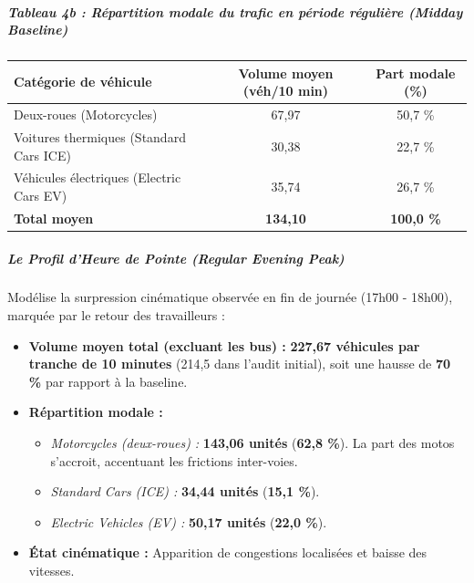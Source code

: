 \documentclass[10pt, a4paper]{article}
\newcounter{none}
\providecommand{\tightlist}{}
\begin{document}
\subparagraph{Tableau 4b : Répartition modale du trafic en période
régulière (Midday
Baseline)}\label{tableau-4b-ruxe9partition-modale-du-trafic-en-puxe9riode-ruxe9guliuxe8re-midday-baseline}

{\def\LTcaptype{none} %
\begin{longtable}[]{@{}lcc@{}}
\toprule\noalign{}
Catégorie de véhicule & Volume moyen (véh/10 min) & Part modale (\%) \\
\midrule\noalign{}
\endhead
\bottomrule\noalign{}
\endlastfoot
Deux-roues (Motorcycles) & 67,97 & 50,7 \% \\
Voitures thermiques (Standard Cars ICE) & 30,38 & 22,7 \% \\
Véhicules électriques (Electric Cars EV) & 35,74 & 26,7 \% \\
\textbf{Total moyen} & \textbf{134,10} & \textbf{100,0 \%} \\
\end{longtable}
}

\subparagraph{Le Profil d'Heure de Pointe (Regular Evening
Peak)}\label{le-profil-dheure-de-pointe-regular-evening-peak}

Modélise la surpression cinématique observée en fin de journée (17h00 -
18h00), marquée par le retour des travailleurs :

\begin{itemize}
\tightlist
\item
  \textbf{Volume moyen total (excluant les bus) :} \textbf{227,67
  véhicules par tranche de 10 minutes} (214,5 dans l'audit initial),
  soit une hausse de \textbf{70 \%} par rapport à la baseline.
\item
  \textbf{Répartition modale :}

  \begin{itemize}
  \tightlist
  \item
    \emph{Motorcycles (deux-roues) :} \textbf{143,06 unités}
    (\textbf{62,8 \%}). La part des motos s'accroit, accentuant les
    frictions inter-voies.
  \item
    \emph{Standard Cars (ICE) :} \textbf{34,44 unités} (\textbf{15,1
    \%}).
  \item
    \emph{Electric Vehicles (EV) :} \textbf{50,17 unités} (\textbf{22,0
    \%}).
  \end{itemize}
\item
  \textbf{État cinématique :} Apparition de congestions localisées et
  baisse des vitesses.
\end{itemize}
\end{document}
